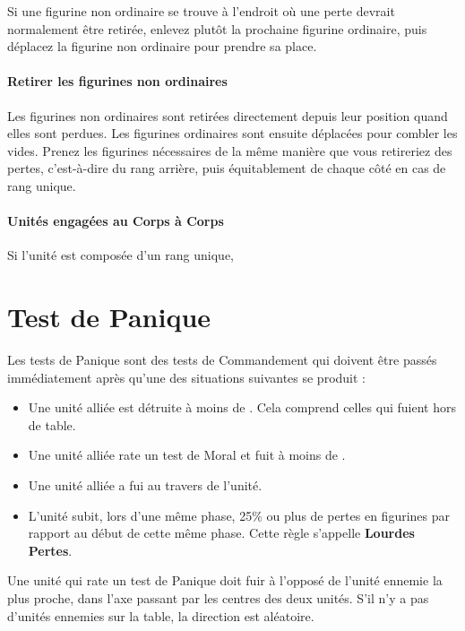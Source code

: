 Si une figurine non ordinaire se trouve à l'endroit où une perte devrait normalement être retirée, enlevez plutôt la prochaine figurine ordinaire, puis déplacez la figurine non ordinaire pour prendre sa place.

\paragraph{Retirer les figurines non ordinaires}

Les figurines non ordinaires sont retirées directement depuis leur position quand elles sont perdues. Les figurines ordinaires sont ensuite déplacées pour combler les vides. Prenez les figurines nécessaires de la même manière que vous retireriez des pertes, c'est-à-dire du rang arrière, puis équitablement de chaque côté en cas de rang unique.

\paragraph{Unités engagées au Corps à Corps}

Si l'unité est composée d'un rang unique, 

\hypertarget{panictest}{\section{Test de Panique}}

Les tests de Panique sont des tests de Commandement qui doivent être passés immédiatement après qu'une des situations suivantes se produit :
\begin{itemize}[label={-}]
\item Une unité alliée est détruite à moins de . Cela comprend celles qui fuient hors de table.
\item Une unité alliée rate un test de Moral et fuit à moins de .
\item Une unité alliée a fui au travers de l'unité.
\item L'unité subit, lors d'une même phase, 25\% ou plus de pertes en figurines par rapport au début de cette même phase. Cette règle s'appelle \textbf{Lourdes Pertes}.
\end{itemize}

Une unité qui rate un test de Panique doit fuir à l'opposé de l'unité ennemie la plus proche, dans l'axe passant par les centres des deux unités. S'il n'y a pas d'unités ennemies sur la table, la direction est aléatoire.

